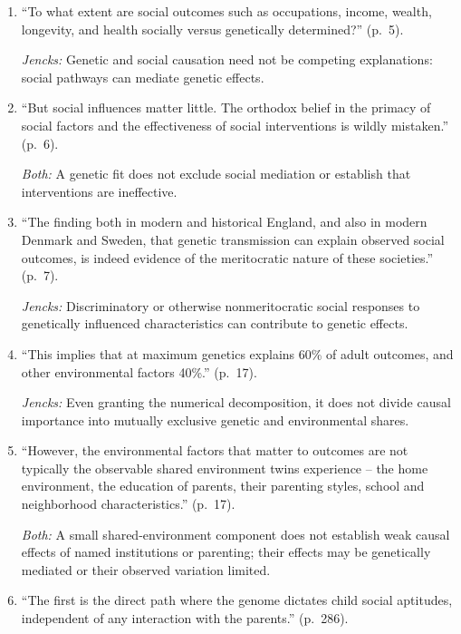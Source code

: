 \begin{enumerate}[label=\arabic*.]
\item ``To what extent are social outcomes such as occupations, income, wealth, longevity, and health socially versus genetically determined?'' (p.~5).

\emph{Jencks:} Genetic and social causation need not be competing explanations: social pathways can mediate genetic effects.

\item ``But social influences matter little. The orthodox belief in the primacy of social factors and the effectiveness of social interventions is wildly mistaken.'' (p.~6).

\emph{Both:} A genetic fit does not exclude social mediation or establish that interventions are ineffective.

\item ``The finding both in modern and historical England, and also in modern Denmark and Sweden, that genetic transmission can explain observed social outcomes, is indeed evidence of the meritocratic nature of these societies.'' (p.~7).

\emph{Jencks:} Discriminatory or otherwise nonmeritocratic social responses to genetically influenced characteristics can contribute to genetic effects.

\item ``This implies that at maximum genetics explains 60\% of adult outcomes, and other environmental factors 40\%.'' (p.~17).

\emph{Jencks:} Even granting the numerical decomposition, it does not divide causal importance into mutually exclusive genetic and environmental shares.

\item ``However, the environmental factors that matter to outcomes are not typically the observable shared environment twins experience -- the home environment, the education of parents, their parenting styles, school and neighborhood characteristics.'' (p.~17).

\emph{Both:} A small shared-environment component does not establish weak causal effects of named institutions or parenting; their effects may be genetically mediated or their observed variation limited.

\item ``The first is the direct path where the genome dictates child social aptitudes, independent of any interaction with the parents.'' (p.~286).


\end{enumerate}
